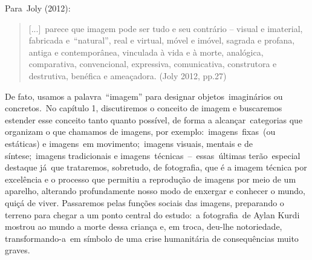 \documentclass[
  letterpaper,
]{scrbook}
\begin{document}
Para~Joly (2012):

\begin{quote}
{[}...{]}~parece que imagem pode ser tudo e seu contrário -- visual e
imaterial, fabricada e~``natural'', real e virtual, móvel e imóvel,
sagrada e profana, antiga e contemporânea, vinculada à vida e à morte,
analógica, comparativa, convencional, expressiva, comunicativa,
construtora e destrutiva, benéfica e ameaçadora. (Joly 2012, pp.27)~
\end{quote}

De fato, usamos a palavra~``imagem'' para designar objetos~imaginários
ou concretos.~No capítulo 1, discutiremos o conceito de imagem e
buscaremos estender esse conceito tanto quanto possível, de forma a
alcançar~categorias que organizam o que chamamos de imagens, por
exemplo:~imagens~fixas~(ou estáticas) e imagens~em movimento;~imagens
visuais, mentais e de síntese;~imagens tradicionais e
imagens~técnicas~--~essas~últimas terão~especial destaque já~que
trataremos, sobretudo, de fotografia, que é a imagem técnica por
excelência e o processo que permitiu a reprodução de imagens por meio de
um aparelho, alterando profundamente nosso modo de enxergar e conhecer o
mundo, quiçá de viver. Passaremos pelas funções sociais das imagens,
preparando o terreno para chegar a um ponto central do estudo:~a
fotografia~de Aylan Kurdi mostrou ao mundo a morte dessa criança e, em
troca, deu-lhe notoriedade, transformando-a~em símbolo de uma crise
humanitária de consequências muito graves.~
\end{document}
